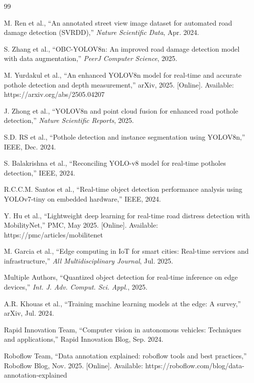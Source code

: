\documentclass{ieeeaccess}
\begin{document}
\begin{thebibliography}{99}

M. Ren et al., ``An annotated street view image dataset for automated road damage detection (SVRDD),'' \textit{Nature Scientific Data}, Apr. 2024.

S. Zhang et al., ``OBC-YOLOV8n: An improved road damage detection model with data augmentation,'' \textit{PeerJ Computer Science}, 2025.

M. Yurdakul et al., ``An enhanced YOLOV8n model for real-time and accurate pothole detection and depth measurement,'' arXiv, 2025. [Online]. Available: https://arxiv.org/abs/2505.04207

J. Zhong et al., ``YOLOV8n and point cloud fusion for enhanced road pothole detection,'' \textit{Nature Scientific Reports}, 2025.

S.D. RS et al., ``Pothole detection and instance segmentation using YOLOV8n,'' IEEE, Dec. 2024.

S. Balakrishna et al., ``Reconciling YOLO-v8 model for real-time potholes detection,'' IEEE, 2024.

R.C.C.M. Santos et al., ``Real-time object detection performance analysis using YOLOv7-tiny on embedded hardware,'' IEEE, 2024.

Y. Hu et al., ``Lightweight deep learning for real-time road distress detection with MobilityNet,'' PMC, May 2025. [Online]. Available: https://pmc/articles/mobilitenet

M. Garcia et al., ``Edge computing in IoT for smart cities: Real-time services and infrastructure,'' \textit{All Multidisciplinary Journal}, Jul. 2025.

Multiple Authors, ``Quantized object detection for real-time inference on edge devices,'' \textit{Int. J. Adv. Comput. Sci. Appl.}, 2025.

A.R. Khouas et al., ``Training machine learning models at the edge: A survey,'' arXiv, Jul. 2024.

Rapid Innovation Team, ``Computer vision in autonomous vehicles: Techniques and applications,'' Rapid Innovation Blog, Sep. 2024.

Roboflow Team, ``Data annotation explained: roboflow tools and best practices,'' Roboflow Blog, Nov. 2025. [Online]. Available: https://roboflow.com/blog/data-annotation-explained


\end{thebibliography}
\end{document}
